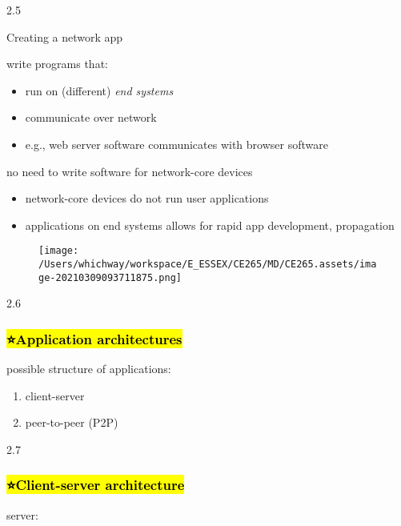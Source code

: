 \documentclass[
]{article}
\begin{document}
2.5

Creating a network app

write programs that:

\begin{itemize}
\item
  run on (different) \emph{end systems}
\item
  communicate over network
\item
  e.g., web server software communicates with browser software
\end{itemize}

no need to write software for network-core devices

\begin{itemize}
\item
  network-core devices do not run user applications
\item
  applications on end systems allows for rapid app development,
  propagation
\end{itemize}

\begin{figure}
\centering
\texttt{[image: /Users/whichway/workspace/E\_ESSEX/CE265/MD/CE265.assets/image-20210309093711875.png]}
\caption{}
\end{figure}

2.6

\hypertarget{application-architectures}{%
\subsubsection{\texorpdfstring{\hl{⭐️Application
architectures}}{⭐️Application architectures}}\label{application-architectures}}

possible structure of applications:

\begin{enumerate}
\def\labelenumi{\arabic{enumi}.}
\item
  client-server
\item
  peer-to-peer (P2P)
\end{enumerate}

2.7

\hypertarget{client-server-architecture}{%
\subsubsection{\texorpdfstring{\hl{⭐️Client-server
architecture}}{⭐️Client-server architecture}}\label{client-server-architecture}}

server:
\end{document}
